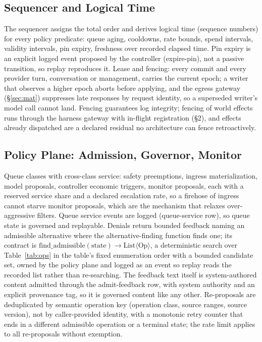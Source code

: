 \documentclass[11pt]{article}
\begin{document}
\subsection{Sequencer and Logical Time}
The sequencer assigns the total order and derives logical time (sequence numbers) for every policy predicate: queue aging, cooldowns, rate bounds, spend intervals, validity intervals, pin expiry, freshness over recorded elapsed time. Pin expiry is an explicit logged event proposed by the controller (expire-pin), not a passive transition, so replay reproduces it. Lease and fencing: every commit and every provider turn, conversation or management, carries the current epoch; a writer that observes a higher epoch aborts before applying, and the egress gateway (\S\ref{sec:mat}) suppresses late responses by request identity, so a superseded writer's model call cannot land. Fencing guarantees log integrity; fencing of world effects runs through the harness gateway with in-flight registration (\S2), and effects already dispatched are a declared residual no architecture can fence retroactively.

\subsection{Policy Plane: Admission, Governor, Monitor}
\label{sec:admission}
Queue classes with cross-class service: safety preemptions, ingress materialization, model proposals, controller economic triggers, monitor proposals, each with a reserved service share and a declared escalation rate, so a firehose of ingress cannot starve monitor proposals, which are the mechanism that relaxes over-aggressive filters. Queue service events are logged (queue-service row), so queue state is governed and replayable. Denials return bounded feedback naming an admissible alternative where the alternative-finding function finds one; its contract is $\mathrm{find\_admissible}(\mathrm{state}) \to \mathrm{List}\langle \mathrm{Op} \rangle$, a deterministic search over Table~\ref{tab:ops} in the table's fixed enumeration order with a bounded candidate set, owned by the policy plane and logged as an event so replay reads the recorded list rather than re-searching. The feedback text itself is system-authored content admitted through the admit-feedback row, with system authority and an explicit provenance tag, so it is governed content like any other. Re-proposals are deduplicated by semantic operation key (operation class, source ranges, source version), not by caller-provided identity, with a monotonic retry counter that ends in a different admissible operation or a terminal state; the rate limit applies to all re-proposals without exemption.
\end{document}
